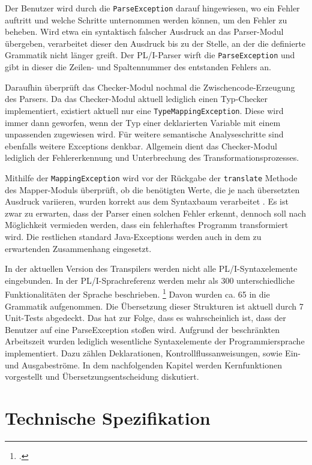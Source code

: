 Der Benutzer wird durch die \verb+ParseException+ darauf hingewiesen, wo ein Fehler auftritt und welche Schritte unternommen werden können, um den Fehler zu beheben.
Wird etwa ein syntaktisch falscher Ausdruck an das Parser-Modul übergeben, verarbeitet dieser den Ausdruck
bis zu der Stelle, an der die definierte Grammatik nicht länger greift.
Der PL/I-Parser wirft die \verb+ParseException+ und gibt in dieser die Zeilen- und Spaltennummer des
entstanden Fehlers an.

Daraufhin überprüft das Checker-Modul nochmal die Zwischencode-Erzeugung des Parsers.
Da das Checker-Modul aktuell lediglich einen Typ-Checker implementiert, existiert aktuell nur eine \verb+TypeMappingException+.
Diese wird immer dann geworfen, wenn der Typ einer deklarierten Variable mit einem unpassenden zugewiesen wird.
Für weitere semantische Analyseschritte sind ebenfalls weitere Exceptions denkbar. Allgemein dient das Checker-Modul lediglich der Fehlererkennung und Unterbrechung des Transformationsprozesses.

Mithilfe der \verb+MappingException+ wird vor der Rückgabe der \verb+translate+ Methode des Mapper-Moduls überprüft, ob 
die benötigten Werte, die je nach übersetzten Ausdruck variieren, wurden korrekt aus dem Syntaxbaum verarbeitet .
Es ist zwar zu erwarten, dass der Parser einen solchen Fehler erkennt, dennoch soll nach Möglichkeit vermieden werden, dass ein fehlerhaftes Programm transformiert wird. Die restlichen standard Java-Exceptions werden auch in dem zu erwartenden Zusammenhang eingesetzt.

In der aktuellen Version des Transpilers werden nicht alle PL/I-Syntaxelemente eingebunden.
In der PL/I-Sprachreferenz werden mehr als 300 unterschiedliche Funktionalitäten der Sprache beschrieben. \footcite[Vgl. ][S. 5ff.]{pliref}
Davon wurden ca. 65 in die Grammatik aufgenommen. Die Übersetzung dieser Strukturen ist aktuell durch 7 Unit-Tests abgedeckt.
Das hat zur Folge, dass es wahrscheinlich ist, dass der Benutzer auf eine ParseException stoßen wird.
Aufgrund der beschränkten Arbeitszeit wurden lediglich wesentliche Syntaxelemente der Programmiersprache implementiert.
Dazu zählen Deklarationen, Kontrollflussanweisungen, sowie Ein- und Ausgabeströme.
In dem nachfolgenden Kapitel werden Kernfunktionen vorgestellt und Übersetzungsentscheidung
diskutiert. 

\pagebreak
\section{Technische Spezifikation}
